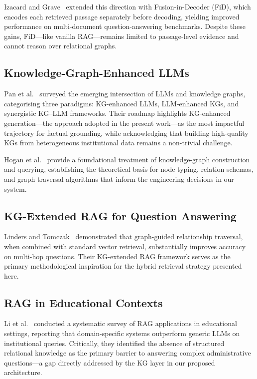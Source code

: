\documentclass{ieeeaccess}
\begin{document}
Izacard and Grave~\cite{b4} extended this direction with Fusion-in-Decoder (FiD), which encodes each retrieved passage separately before decoding, yielding improved performance on multi-document question-answering benchmarks. Despite these gains, FiD---like vanilla RAG---remains limited to passage-level evidence and cannot reason over relational graphs.

\subsection{Knowledge-Graph-Enhanced LLMs}
Pan et al.~\cite{b6} surveyed the emerging intersection of LLMs and knowledge graphs, categorising three paradigms: KG-enhanced LLMs, LLM-enhanced KGs, and synergistic KG--LLM frameworks. Their roadmap highlights KG-enhanced generation---the approach adopted in the present work---as the most impactful trajectory for factual grounding, while acknowledging that building high-quality KGs from heterogeneous institutional data remains a non-trivial challenge.

Hogan et al.~\cite{b5} provide a foundational treatment of knowledge-graph construction and querying, establishing the theoretical basis for node typing, relation schemas, and graph traversal algorithms that inform the engineering decisions in our system.

\subsection{KG-Extended RAG for Question Answering}
Linders and Tomczak~\cite{b1} demonstrated that graph-guided relationship traversal, when combined with standard vector retrieval, substantially improves accuracy on multi-hop questions. Their KG-extended RAG framework serves as the primary methodological inspiration for the hybrid retrieval strategy presented here.

\subsection{RAG in Educational Contexts}
Li et al.~\cite{b2} conducted a systematic survey of RAG applications in educational settings, reporting that domain-specific systems outperform generic LLMs on institutional queries. Critically, they identified the absence of structured relational knowledge as the primary barrier to answering complex administrative questions---a gap directly addressed by the KG layer in our proposed architecture.
\end{document}
